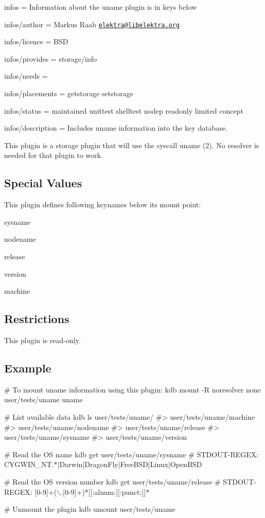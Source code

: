 
\begin{DoxyItemize}
\item infos = Information about the uname plugin is in keys below
\item infos/author = Markus Raab \href{mailto:elektra@libelektra.org}{\tt elektra@libelektra.\+org}
\item infos/licence = B\+SD
\item infos/provides = storage/info
\item infos/needs =
\item infos/placements = getstorage setstorage
\item infos/status = maintained unittest shelltest nodep readonly limited concept
\item infos/description = Includes uname information into the key database.
\end{DoxyItemize}

This plugin is a storage plugin that will use the syscall {\ttfamily uname (2)}. No resolver is needed for that plugin to work.

\subsection*{Special Values}

This plugin defines following keynames below its mount point\+:


\begin{DoxyItemize}
\item sysname
\item nodename
\item release
\item version
\item machine
\end{DoxyItemize}

\subsection*{Restrictions}

This plugin is read-\/only.

\subsection*{Example}


\begin{DoxyCode}
# To mount uname information using this plugin:
kdb mount -R noresolver none user/tests/uname uname

# List available data
kdb ls user/tests/uname/
#> user/tests/uname/machine
#> user/tests/uname/nodename
#> user/tests/uname/release
#> user/tests/uname/sysname
#> user/tests/uname/version

# Read the OS name
kdb get user/tests/uname/sysname
# STDOUT-REGEX: CYGWIN\_NT.*|Darwin|DragonFly|FreeBSD|Linux|OpenBSD

# Read the OS version number
kdb get user/tests/uname/release
# STDOUT-REGEX: [0-9]+(\(\backslash\).[0-9]+)*[[:alnum:][:punct:]]*

# Unmount the plugin
kdb umount user/tests/uname
\end{DoxyCode}
 